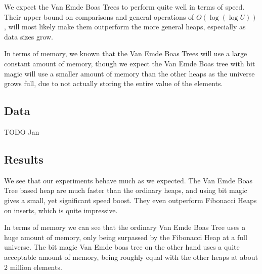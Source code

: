 We expect the Van Emde Boas Trees to perform quite well in terms of speed. Their upper bound on comparisons and general operations of $O(\log (\log U))$, will most likely  make them outperform the more general heaps, especially as data sizes grow.

In terms of memory, we known that the Van Emde Boas Trees will use a large constant amount of memory, though we expect the Van Emde Boas tree with bit magic will use a smaller amount of memory than the other heaps as the universe grows full, due to not actually storing the entire value of the elements.

\subsection{Data}

TODO Jan

\subsection{Results}

We see that our experiments behave much as we expected. The Van Emde Boas Tree  based heap are much faster than the ordinary heaps, and using bit magic gives a small, yet significant speed boost. They even outperform Fibonacci Heaps on inserts, which is quite impressive.

In terms of memory we can see that the ordinary Van Emde Boas Tree uses a huge amount of memory, only being surpassed by the Fibonacci Heap at a full universe. The bit magic Van Emde boas tree on the other hand uses a quite acceptable amount of memory, being roughly equal with the other heaps at about 2 million elements.